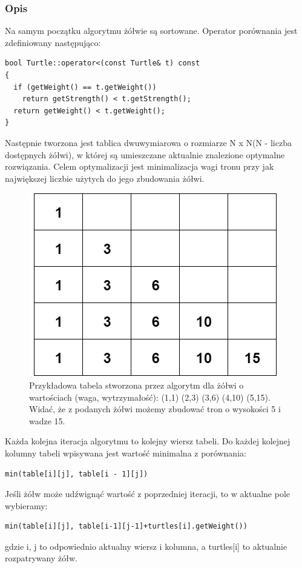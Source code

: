 \documentclass[11pt,a4paper]{article}
\begin{document}
\subsubsection{Opis}
Na samym początku algorytmu żółwie są sortowane. Operator porównania jest zdefiniowany następująco:
\begin{lstlisting}
bool Turtle::operator<(const Turtle& t) const
{
  if (getWeight() == t.getWeight())
    return getStrength() < t.getStrength();
  return getWeight() < t.getWeight();
}
\end{lstlisting}
Następnie tworzona jest tablica dwuwymiarowa o rozmiarze N x N(N - liczba dostępnych żółwi), w której są umieszczane aktualnie znalezione optymalne rozwiązania. Celem optymalizacji jest minimalizacja wagi tronu przy jak największej liczbie użytych do jego zbudowania żółwi.
\begin{figure}[h]
  \centering
  \includegraphics[scale=0.5]{table.png}
  \caption{Przykładowa tabela stworzona przez algorytm dla żółwi o wartościach (waga, wytrzymałość): (1,1) (2,3) (3,6) (4,10) (5,15). 
Widać, że z podanych żółwi możemy zbudować tron o wysokości 5 i wadze 15. }
  \label{fig:table1}
\end{figure}

Każda kolejna iteracja algorytmu to kolejny wiersz tabeli. Do każdej kolejnej kolumny tabeli wpisywana jest wartość minimalna z porównania:
\begin{lstlisting}
min(table[i][j], table[i - 1][j])
\end{lstlisting}
Jeśli żółw może udźwignąć wartość z poprzedniej iteracji, to w aktualne pole wybieramy: 
\begin{lstlisting}
min(table[i][j], table[i-1][j-1]+turtles[i].getWeight())
\end{lstlisting}
gdzie i, j to odpowiednio aktualny wiersz i kolumna, a turtles[i] to aktualnie rozpatrywany żółw.
\end{document}
